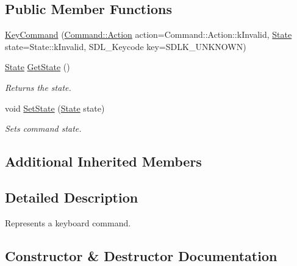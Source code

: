 \subsection*{Public Member Functions}
\begin{DoxyCompactItemize}
\item 
\mbox{\hyperlink{class_key_command_ad60da4c304d27c3d54aed183e361d9e8}{Key\+Command}} (\mbox{\hyperlink{class_command_a45bbda49e9ee96d262ac651fefffe487}{Command\+::\+Action}} action=Command\+::\+Action\+::k\+Invalid, \mbox{\hyperlink{class_key_command_abd933bd3181a248c86fdd38801647e92}{State}} state=State\+::k\+Invalid, S\+D\+L\+\_\+\+Keycode key=S\+D\+L\+K\+\_\+\+U\+N\+K\+N\+O\+WN)
\item 
\mbox{\label{class_key_command_a3de8b2fef57cb8a275c937b9c1424f03}} 
\mbox{\hyperlink{class_key_command_abd933bd3181a248c86fdd38801647e92}{State}} \mbox{\hyperlink{class_key_command_a3de8b2fef57cb8a275c937b9c1424f03}{Get\+State}} ()
\begin{DoxyCompactList}\small\item\em Returns the state. \end{DoxyCompactList}\item 
void \mbox{\hyperlink{class_key_command_a7c899ef655747d0386f55833b3b2b542}{Set\+State}} (\mbox{\hyperlink{class_key_command_abd933bd3181a248c86fdd38801647e92}{State}} state)
\begin{DoxyCompactList}\small\item\em Sets command state. \end{DoxyCompactList}\end{DoxyCompactItemize}
\subsection*{Additional Inherited Members}


\subsection{Detailed Description}
Represents a keyboard command. 

\subsection{Constructor \& Destructor Documentation}
\mbox{\label{class_key_command_ad60da4c304d27c3d54aed183e361d9e8}} 
